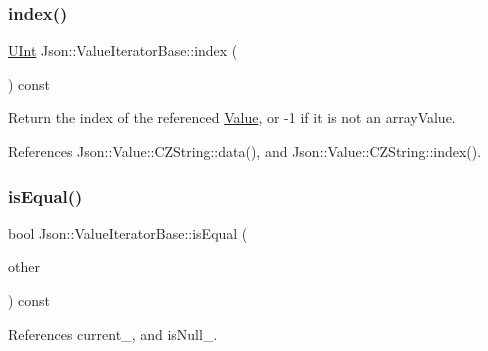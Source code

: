 \subsubsection{\texorpdfstring{index()}{index()}}
{\footnotesize\ttfamily \hyperlink{namespaceJson_a800fb90eb6ee8d5d62b600c06f87f7d4_a800fb90eb6ee8d5d62b600c06f87f7d4}{U\+Int} Json\+::\+Value\+Iterator\+Base\+::index (\begin{DoxyParamCaption}{ }\end{DoxyParamCaption}) const}



Return the index of the referenced \hyperlink{classJson_1_1Value}{Value}, or -\/1 if it is not an array\+Value. 



References Json\+::\+Value\+::\+C\+Z\+String\+::data(), and Json\+::\+Value\+::\+C\+Z\+String\+::index().

\mbox{\label{classJson_1_1ValueIteratorBase_a010b5ad3f3337ae3732e5d7e16ca5e25_a010b5ad3f3337ae3732e5d7e16ca5e25}} 
\subsubsection{\texorpdfstring{is\+Equal()}{isEqual()}}
{\footnotesize\ttfamily bool Json\+::\+Value\+Iterator\+Base\+::is\+Equal (\begin{DoxyParamCaption}\item[{const \hyperlink{classJson_1_1ValueIteratorBase_a9d2a940d03ea06d20d972f41a89149ee_a9d2a940d03ea06d20d972f41a89149ee}{Self\+Type} \&}]{other }\end{DoxyParamCaption}) const\hspace{0.3cm}{\ttfamily [protected]}}



References current\+\_\+, and is\+Null\+\_\+.

\mbox{\label{classJson_1_1ValueIteratorBase_a3838ba39c43c518cf3ed4aa6ce78ccad_a3838ba39c43c518cf3ed4aa6ce78ccad}} 
